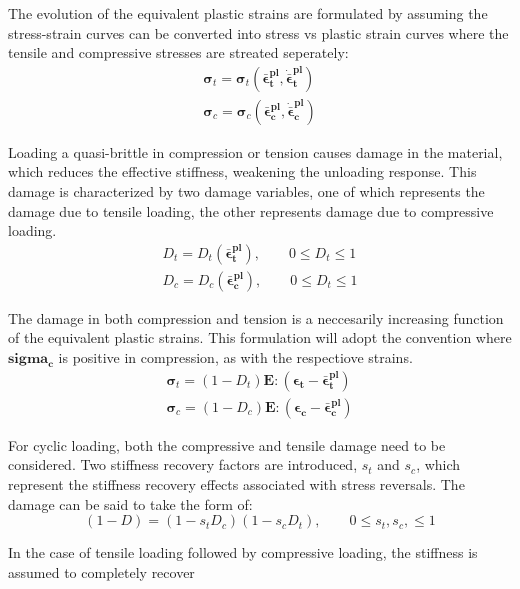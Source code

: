 The evolution of the equivalent plastic strains are formulated by assuming the stress-strain curves can be converted  into stress vs plastic strain curves where the tensile and compressive stresses are streated seperately:
\begin{equation}
\label{eqn:dam1}
\begin{aligned}
\boldsymbol{\sigma}_t = \boldsymbol{\sigma}_t(\boldsymbol{\bar{\epsilon}^{pl}_t},
	\boldsymbol{\dot{\bar{\epsilon}}^{pl}_t}) \\
\boldsymbol{\sigma}_c = \boldsymbol{\sigma}_c(\boldsymbol{\bar{\epsilon}^{pl}_c},
	\boldsymbol{\dot{\bar{\epsilon}}^{pl}_c})
\end{aligned}
\end{equation}

Loading a quasi-brittle in compression or tension causes damage in the material, which reduces the effective stiffness, weakening the unloading response. This damage is characterized by two damage variables, one of which represents the damage due to tensile loading, the other represents damage due to compressive loading. 
\begin{equation}
\label{eqn:dam2}
\begin{aligned}
D_t = D_t(\boldsymbol{\bar{\epsilon}^{pl}_t}),\qquad 0 \leq D_t \leq 1 \\
D_c = D_c(\boldsymbol{\bar{\epsilon}^{pl}_c}),\qquad 0 \leq D_t \leq 1
\end{aligned}
\end{equation}

The damage in both compression and tension is a neccesarily increasing function of the equivalent plastic strains. This formulation will adopt the convention where $\boldsymbol{sigma_c}$ is positive in compression, as with the respectiove strains.
\begin{equation}
\label{eqn:dam3}
\begin{aligned}
\boldsymbol{\sigma}_t = (1-D_t)\mathbf{E}:(\boldsymbol{\epsilon_t} - \boldsymbol{\bar{\epsilon}^{pl}_t}) \\
\boldsymbol{\sigma}_c = (1-D_c)\mathbf{E}:(\boldsymbol{\epsilon_c} - \boldsymbol{\bar{\epsilon}^{pl}_c})
\end{aligned}
\end{equation}

For cyclic loading, both the compressive and tensile damage need to be considered. Two stiffness recovery factors are introduced, $s_t$ and $s_c$, which represent the stiffness recovery effects associated with stress reversals. The damage can be said to take the form of:
\begin{equation}
\label{eqn:dam4}
(1-D) = (1-s_t D_c)(1-s_c D_t),\qquad 0 \leq s_t, s_c, \leq 1
\end{equation}

In the case of tensile loading followed by compressive loading, the stiffness is assumed to completely recover

